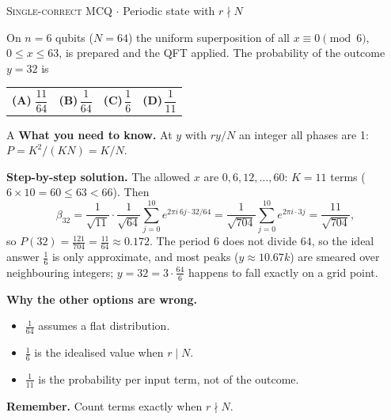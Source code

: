 \documentclass[11pt,a4paper]{article}
\newcommand{\optlabel}[1]{\textbf{(#1)}}
\newcommand{\correctlabel}[1]{\textcolor{okgreen}{\textbf{(#1)}\,\ding{51}}}
\newenvironment{qitem}[1]{\begin{list}{}{\setlength{\leftmargin}{3.3em}\setlength{\labelwidth}{3.1em}%
  \setlength{\labelsep}{0.2em}\setlength{\topsep}{3pt}\setlength{\parsep}{3pt}}\item[\textbf{Q.#1}\hfill]}{\end{list}}
\newcommand{\qsep}{\par\vspace{2pt}{\color{black!15}\hrule}\vspace{4pt}}
\newcommand{\qmeta}[2]{{\footnotesize\color{black!60}\textsc{#1} \;$\cdot$\; #2}\par}
\begin{document}
\begin{qitem}{72}
\qmeta{Single-correct MCQ}{Periodic state with $r\nmid N$}
On $n = 6$ qubits ($N = 64$) the uniform superposition of all $x \equiv 0 \pmod 6$, $0 \le x \le 63$, is prepared and the
QFT applied. The probability of the outcome $y = 32$ is
\par\smallskip\noindent\begin{tabularx}{\linewidth}{@{}*{4}{L}@{}}
\correctlabel{A}\,$\dfrac{11}{64}$ & \optlabel{B}\,$\dfrac{1}{64}$ & \optlabel{C}\,$\dfrac16$ & \optlabel{D}\,$\dfrac{1}{11}$
\end{tabularx}
\end{qitem}
\begin{solbox}{A}
\textbf{\color{brand}What you need to know.} At $y$ with $ry/N$ an integer all phases are 1: $P = K^2/(KN) = K/N$.

\textbf{\color{brand}Step-by-step solution.} The allowed $x$ are $0, 6, 12, \dots, 60$: $K = 11$ terms ($6\times10 = 60 \le 63 < 66$). Then
\[ \beta_{32} = \frac{1}{\sqrt{11}}\cdot\frac{1}{\sqrt{64}}\sum_{j=0}^{10}e^{2\pi i\,6j\cdot32/64} = \frac{1}{\sqrt{704}}\sum_{j=0}^{10}e^{2\pi i\cdot3j}
   = \frac{11}{\sqrt{704}}, \]
so $P(32) = \frac{121}{704} = \frac{11}{64} \approx 0.172$. The period $6$ does not divide $64$, so the ideal answer $\frac16$ is
only approximate, and most peaks ($y \approx 10.67k$) are smeared over neighbouring integers; $y = 32 = 3\cdot\frac{64}{6}$
happens to fall exactly on a grid point.

\textbf{\color{brand}Why the other options are wrong.}
\begin{itemize}[leftmargin=2.4em, itemsep=1pt, topsep=2pt]
\item[\textbf{(B)}] $\frac1{64}$ assumes a flat distribution.
\item[\textbf{(C)}] $\frac16$ is the idealised value when $r \mid N$.
\item[\textbf{(D)}] $\frac1{11}$ is the probability per input term, not of the outcome.
\end{itemize}
\textbf{\color{brand}Remember.} Count terms exactly when $r \nmid N$.
\end{solbox}
\qsep
\end{document}
